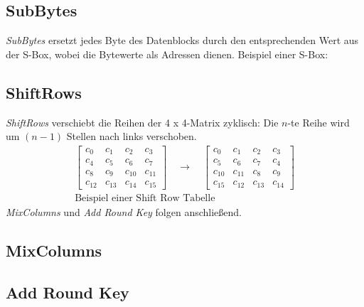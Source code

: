 \subsection{SubBytes}
\textit{SubBytes} ersetzt jedes Byte des Datenblocks durch den entsprechenden Wert aus der S-Box, wobei die Bytewerte als Adressen dienen. Beispiel einer S-Box:
\begin{table}[H]
    \caption{Beispiel einer S-Box im AES-Algorithmus}
\end{table}

\subsection{ShiftRows}
\textit{ShiftRows} verschiebt die Reihen der 4 x 4-Matrix zyklisch: Die $n$-te Reihe wird um $(n-1)$ Stellen nach links verschoben.
\[
\begin{array}{c}
\begin{bmatrix}
c_0  & c_1  & c_2  & c_3  \\
c_4  & c_5  & c_6  & c_7  \\
c_8  & c_9  & c_{10} & c_{11} \\
c_{12} & c_{13} & c_{14} & c_{15}
\end{bmatrix}
\quad\rightarrow\quad
\begin{bmatrix}
c_0  & c_1  & c_2  & c_3  \\
c_5  & c_6  & c_7  & c_4  \\
c_{10} & c_{11} & c_8  & c_9  \\
c_{15} & c_{12} & c_{13} & c_{14}
\end{bmatrix}\\
\text{Beispiel einer Shift Row Tabelle}
\end{array}
\]
\textit{MixColumns} und \textit{Add Round Key} folgen anschließend.

\subsection{MixColumns}
\subsection{Add Round Key}
